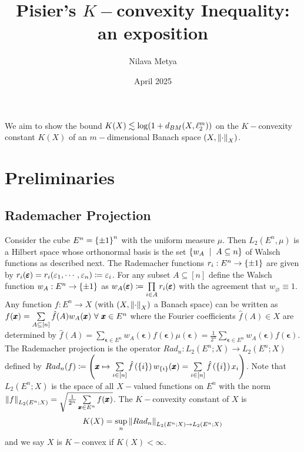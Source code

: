 

\usepackage[
backend=biber,
style=alphabetic,giveninits,
citestyle=ieee-alphabetic,
natbib=true,
uniquelist=false,
maxnames=10,
sorting=ynt
]{biblatex}
%

\allowdisplaybreaks
\title{Pisier's $K-$convexity Inequality: an exposition}
\author{Nilava Metya}

\date{April 2025}






\maketitle

We aim to show the bound $K(X) \lesssim \log(1+d_{BM}(X,\ell_{2}^{m}))$ on the $K-$convexity constant $K(X)$ of an $m-$dimensional Banach space $(X,\left\lVert \cdot \right\rVert_{X})$.

\section{Preliminaries}
\subsection*{Rademacher Projection}
Consider the cube $E^{n} = \left\{\pm 1\right\}^{n}$ with the uniform measure $\mu$. Then $L_{2}(E^{n},\mu)$ is a Hilbert space whose orthonormal basis is the set $\set{w_{A} \st A\subseteq n}$ of Walsch functions as described next. The Rademacher functions $r_{i}:E^{n}\to \left\{\pm1\right\}$ are given by $r_{i}(\pmb {\varepsilon}) = r_{i}(\varepsilon_{1},\cdots,\varepsilon_{n}) \coloneqq \varepsilon_{i}$. For any subset $A\subseteq [n]$ define the Walsch function $w_{A}:E^{n}\to\left\{\pm1\right\}$ as $w_{A}(\pmb {\varepsilon}) \coloneqq \prod\limits_{i\in A}r_{i}(\pmb{\varepsilon})$ with the agreement that $w_{\varnothing} \equiv 1$. Any function $f: E^{n}\to X$ (with $\left(X,\left\lVert \cdot \right\rVert_{X}\right)$ a Banach space) can be written as $f(\pmb x) = \sum\limits_{A\subseteq[n]} \hat f(A) w_{A}(\pmb x)~\forall~ \pmb x\in E^{n}$ where the Fourier coefficients $\hat f(A)\in X$ are determined by $\hat f(A) = \sum\limits_{\pmb \epsilon\in E^{n}}w_{A}(\pmb \epsilon) f(\pmb \epsilon) \mu(\pmb \epsilon) = \frac1{2^{n}}\sum\limits_{\pmb \epsilon\in E^{n}}w_{A}(\pmb \epsilon) f(\pmb \epsilon) $. The Rademacher projection is the operator $Rad_{n}: L_{2}(E^{n}; X) \to L_{2}(E^{n}; X)$ defined by $Rad_{n}(f) \coloneqq \left(\pmb x\mapsto \sum\limits_{i \in [n]} \hat f\left(\left\{i\right\}\right) w_{\left\{i\right\}}(\pmb x) = \sum\limits_{i \in [n]} \hat f\left(\left\{i\right\}\right) x_{i}\right)$. Note that $L_{2}(E^{n};X)$ is the space of all $X-$valued functions on $E^{n}$ with the norm $\left\lVert f \right\rVert_{L_{2}(E^{n};X)} = \sqrt{\frac1{2^{n}}\sum\limits_{\pmb x\in E^{n}} f(\pmb x)}$. The $K-$convexity constant of $X$ is $$K(X) = \sup_{n} \left\lVert Rad_{n} \right\rVert_{L_{2}(E^{n}; X) \to L_{2}(E^{n}; X)}$$ and we say $X$ is $K-$convex if $K(X) < \infty$.

